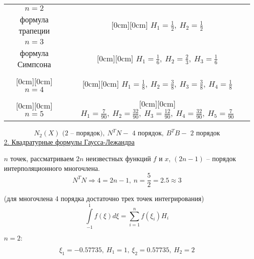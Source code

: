 \documentclass{bmstu}
\begin{document}
\begin{center}
\begin{tabular}{|c|c|}
\hline
$n = 2$ & \\
формула трапеции & \raisebox{1.5ex}[0cm][0cm] {$H_1 = \displaystyle \frac{1}{2},\ H_2 = \frac{1}{2}$}  \\
\hline
$n=3$ & \\
формула Симпсона & \raisebox{1.5ex}[0cm][0cm] {$H_1 = \displaystyle \frac{1}{6},\ H_2 = \frac{2}{3},\ H_3 = \frac{1}{6}$}  \\
\hline
& \\
\raisebox{1.5ex}[0cm][0cm] {$n=4$} & \raisebox{1.5ex}[0cm][0cm] {$H_1 = \displaystyle \frac{1}{8},\ H_2 = \frac{3}{8},\ H_3 = \frac{3}{8},\ H_4 = \frac{1}{8}$}  \\
\hline
& \\
\raisebox{1.5ex}[0cm][0cm] {$n=5$} & \raisebox{1.5ex}[0cm][0cm] {$H_1 = \displaystyle \frac{7}{90},\ H_2 = \frac{32}{90},\ H_3 = \frac{12}{90},\ H_4 = \frac{32}{90},\ H_5 = \frac{7}{90}$}  \\
\hline
\end{tabular}
\end{center}
\[
N_2(X) \text{ (2 -- порядок)},\ N^TN - \text{ 4 порядок},\ B^T B - \text{ 2 порядок}
\]
\newpage
\underline{2. Квадратурные формулы Гаусса-Лежандра}

$n$ точек, рассматриваем $2n$ неизвестных функций $f$ и $x$, $(2n-1)$ -- порядок интерполяционного многочлена.
\[
N^T N \Rightarrow 4 = 2n - 1,\ n = \frac{5}{2} = 2.5 \approx 3
\]

(для многочлена 4 порядка достаточно трех точек интегрирования)
\[
\int \limits_{-1}^1 f(\xi) d\xi = \sum \limits_{i = 1}^n f(\xi_i) H_i
\]

$n = 2:$
\begin{center}
\end{center}
\[
\xi_1 = -0.57735,\ H_1 = 1,\ \xi_2 = 0.57735,\ H_2 = 2
\]
\end{document}
